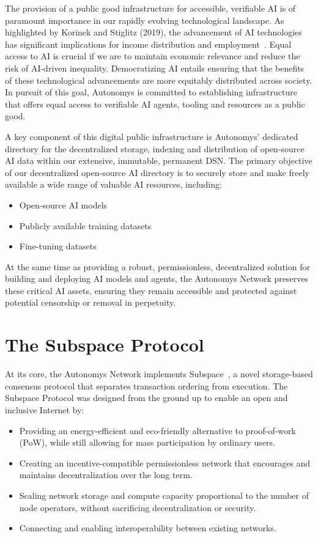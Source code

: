 \documentclass[conference]{IEEEtran}
\begin{document}
The provision of a public good infrastructure for accessible, verifiable AI is of paramount importance in our rapidly evolving technological landscape. As highlighted by Korinek and Stiglitz (2019), the advancement of AI technologies has significant implications for income distribution and employment~\cite{korinek2019}. Equal access to AI is crucial if we are to maintain economic relevance and reduce the risk of AI-driven inequality. Democratizing AI entails ensuring that the benefits of these technological advancements are more equitably distributed across society. In pursuit of this goal, Autonomys is committed to establishing infrastructure that offers equal access to verifiable AI agents, tooling and resources as a public good.

A key component of this digital public infrastructure is Autonomys' dedicated directory for the decentralized storage, indexing and distribution of open-source AI data within our extensive, immutable, permanent DSN. The primary objective of our decentralized open-source AI directory is to securely store and make freely available a wide range of valuable AI resources, including:
\begin{itemize}
    \item Open-source AI models
    \item Publicly available training datasets
    \item Fine-tuning datasets
\end{itemize}

At the same time as providing a robust, permissionless, decentralized solution for building and deploying AI models and agents, the Autonomys Network preserves these critical AI assets, ensuring they remain accessible and protected against potential censorship or removal in perpetuity.

\section{The Subspace Protocol}
\label{sec:subspace}
At its core, the Autonomys Network implements Subspace~\cite{subspacev1}, a novel storage-based consensus protocol that separates transaction ordering from execution. The Subspace Protocol was designed from the ground up to enable an open and inclusive Internet by:
\begin{itemize}
    \item Providing an energy-efficient and eco-friendly alternative to proof-of-work (PoW), while still allowing for mass participation by ordinary users.
    \item Creating an incentive-compatible permissionless network that encourages and maintains decentralization over the long term.
    \item Scaling network storage and compute capacity proportional to the number of node operators, without sacrificing decentralization or security.
    \item Connecting and enabling interoperability between existing networks.
\end{itemize}
\end{document}

